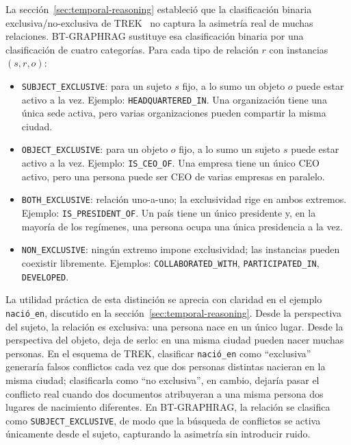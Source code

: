 La sección~\ref{sec:temporal-reasoning} estableció que la clasificación binaria exclusiva/no-exclusiva de TREK~\cite{trek2025} no captura la asimetría real de muchas relaciones. BT-GRAPHRAG sustituye esa clasificación binaria por una clasificación de cuatro categorías. Para cada tipo de relación $r$ con instancias $(s, r, o)$:

\begin{itemize}
    \item \texttt{SUBJECT\_EXCLUSIVE}: para un sujeto $s$ fijo, a lo sumo un objeto $o$ puede estar activo a la vez. Ejemplo: \texttt{HEADQUARTERED\_IN}. Una organización tiene una única sede activa, pero varias organizaciones pueden compartir la misma ciudad.
    \item \texttt{OBJECT\_EXCLUSIVE}: para un objeto $o$ fijo, a lo sumo un sujeto $s$ puede estar activo a la vez. Ejemplo: \texttt{IS\_CEO\_OF}. Una empresa tiene un único CEO activo, pero una persona puede ser CEO de varias empresas en paralelo.
    \item \texttt{BOTH\_EXCLUSIVE}: relación uno-a-uno; la exclusividad rige en ambos extremos. Ejemplo: \texttt{IS\_PRESIDENT\_OF}. Un país tiene un único presidente y, en la mayoría de los regímenes, una persona ocupa una única presidencia a la vez.
    \item \texttt{NON\_EXCLUSIVE}: ningún extremo impone exclusividad; las instancias pueden coexistir libremente. Ejemplos: \texttt{COLLABORATED\_WITH}, \texttt{PARTICIPATED\_IN}, \texttt{DEVELOPED}.
\end{itemize}

La utilidad práctica de esta distinción se aprecia con claridad en el ejemplo \texttt{nació\_en}, discutido en la sección~\ref{sec:temporal-reasoning}. Desde la perspectiva del sujeto, la relación es exclusiva: una persona nace en un único lugar. Desde la perspectiva del objeto, deja de serlo: en una misma ciudad pueden nacer muchas personas. En el esquema de TREK, clasificar \texttt{nació\_en} como ``exclusiva'' generaría falsos conflictos cada vez que dos personas distintas nacieran en la misma ciudad; clasificarla como ``no exclusiva'', en cambio, dejaría pasar el conflicto real cuando dos documentos atribuyeran a una misma persona dos lugares de nacimiento diferentes. En BT-GRAPHRAG, la relación se clasifica como \texttt{SUBJECT\_EXCLUSIVE}, de modo que la búsqueda de conflictos se activa únicamente desde el sujeto, capturando la asimetría sin introducir ruido.

